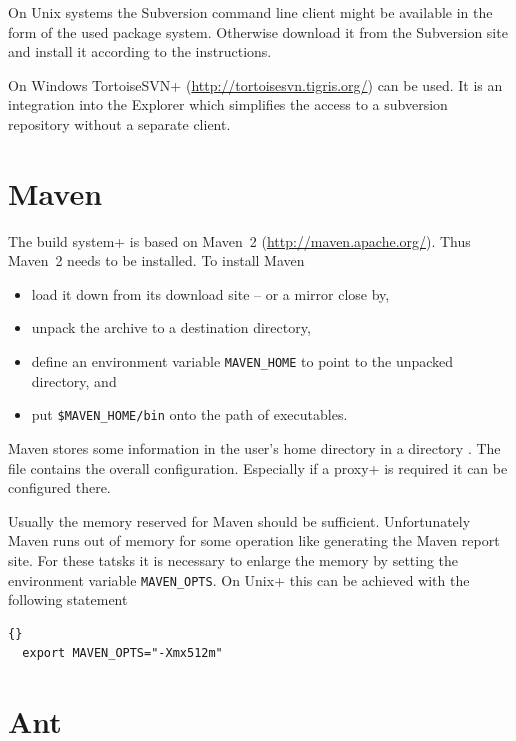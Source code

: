On Unix systems the Subversion command line client might be available
in the form of the used package system. Otherwise download it from the
Subversion site and install it according to the instructions.

On Windows \+TortoiseSVN+ (\url{http://tortoisesvn.tigris.org/}) can
be used. It is an integration into the Explorer which simplifies the
access to a subversion repository without a separate client.


\section{Maven}

The \+build system+ is based on Maven~2 (\url{http://maven.apache.org/}).
Thus Maven~2 needs to be installed. To install Maven 

\begin{itemize}
\item load it down from its download site -- or a mirror close by,
\item unpack the archive to a destination directory,
\item define an environment variable
  \texttt{MAVEN\_HOME} to
  point to the unpacked directory, and
\item put \texttt{\$MAVEN\_HOME/bin} onto the path of executables.
\end{itemize}

Maven stores some information in the user's home directory in a
directory . The file  contains the overall
configuration. Especially if a \+proxy+ is required it can be
configured there.

Usually the memory reserved for Maven should be sufficient.
Unfortunately Maven runs out of memory for some operation like
generating the Maven report site. For these tatsks it is necessary to
enlarge the memory by setting the environment variable
\verb|MAVEN_OPTS|. On \+Unix+
this can be achieved with the following statement
\begin{lstlisting}{}
  export MAVEN_OPTS="-Xmx512m"
\end{lstlisting}


\section{Ant}

